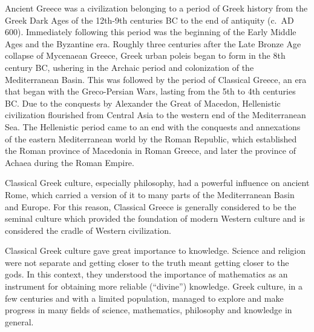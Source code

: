\documentclass[
  openany]{book}
\begin{document}
Ancient Greece was a civilization belonging to a period of Greek history from the Greek Dark Ages of the 12th-9th centuries BC to the end of antiquity (c.~AD 600). Immediately following this period was the beginning of the Early Middle Ages and the Byzantine era. Roughly three centuries after the Late Bronze Age collapse of Mycenaean Greece, Greek urban poleis began to form in the 8th century BC, ushering in the Archaic period and colonization of the Mediterranean Basin. This was followed by the period of Classical Greece, an era that began with the Greco-Persian Wars, lasting from the 5th to 4th centuries BC. Due to the conquests by Alexander the Great of Macedon, Hellenistic civilization flourished from Central Asia to the western end of the Mediterranean Sea. The Hellenistic period came to an end with the conquests and annexations of the eastern Mediterranean world by the Roman Republic, which established the Roman province of Macedonia in Roman Greece, and later the province of Achaea during the Roman Empire.

Classical Greek culture, especially philosophy, had a powerful influence on ancient Rome, which carried a version of it to many parts of the Mediterranean Basin and Europe. For this reason, Classical Greece is generally considered to be the seminal culture which provided the foundation of modern Western culture and is considered the cradle of Western civilization.

Classical Greek culture gave great importance to knowledge. Science and religion were not separate and getting closer to the truth meant getting closer to the gods. In this context, they understood the importance of mathematics as an instrument for obtaining more reliable (``divine'') knowledge. Greek culture, in a few centuries and with a limited population, managed to explore and make progress in many fields of science, mathematics, philosophy and knowledge in general.
\end{document}
